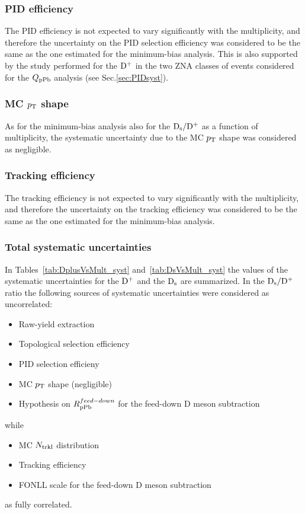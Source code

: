 \subsubsection{PID efficiency}
The PID efficiency is not expected to vary significantly with the multiplicity, and therefore the uncertainty on the PID selection efficiency was considered to be the same as the one estimated for the minimum-bias analysis. This is also supported by the study performed for the ${\rm D^+}$ in the two ZNA classes of events considered for the $Q_{\rm pPb}$ analysis (see Sec.\ref{sec:PIDsyst}).

\subsubsection{MC $p_{\rm T}$ shape}
As for the minimum-bias analysis also for the ${\rm D_s}/{\rm D^+}$ as a function of multiplicity, the systematic uncertainty due to the MC $p_{\rm T}$ shape was considered as negligible.

\subsubsection{Tracking efficiency}
The tracking efficiency is not expected to vary significantly with the multiplicity, and therefore the uncertainty on the tracking efficiency was considered to be the same as the one estimated for the minimum-bias analysis.

\subsubsection{Total systematic uncertainties}
In Tables~\ref{tab:DplusVsMult_syst} and~\ref{tab:DsVsMult_syst} the values of the systematic uncertainties for the ${\rm D^+}$ and the ${\rm D_s}$ are summarized.
In the ${\rm D_s}/{\rm D^+}$ ratio the following sources of systematic uncertainties were considered as uncorrelated:
\begin{itemize}
\item Raw-yield extraction
\item Topological selection efficiency
\item PID selection efficieny
\item MC $p_{\rm T}$ shape (negligible)
\item Hypothesis on $R_{\rm pPb}^{feed-down}$ for the feed-down D meson subtraction
\end{itemize} 
while
\begin{itemize}
\item MC $N_{\rm trkl}$ distribution
\item Tracking efficiency
\item FONLL scale for the feed-down D meson subtraction
\end{itemize} 
as fully correlated.

